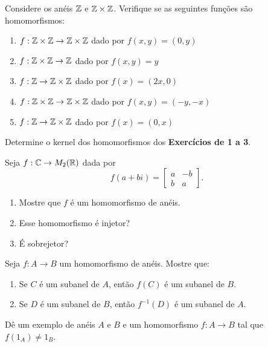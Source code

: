 \documentclass[12pt]{article}
\begin{document}
\questao  Considere os an{\'e}is $\mathbb{Z}$ e $\mathbb{Z}\times \mathbb{Z}$. Verifique se as seguintes funções s{\~a}o homomorfismos:
\begin{enumerate}[label=({\alph*})]
\item $f : \mathbb{Z}\times\mathbb{Z} \to \mathbb{Z}\times\mathbb{Z}$ dado por $f(x,y) = (0,y)$
\item $f : \mathbb{Z}\times\mathbb{Z} \to \mathbb{Z}$ dado por $f(x,y) = y$
\item $f : \mathbb{Z}\to \mathbb{Z}\times\mathbb{Z}$ dado por $f(x) = (2x,0)$
\item $f : \mathbb{Z}\times\mathbb{Z} \to \mathbb{Z}\times\mathbb{Z}$ dado por $f(x,y) = (-y,-x)$
\item $f : \mathbb{Z} \to \mathbb{Z}\times\mathbb{Z}$ dado por $f(x) = (0,x)$
\end{enumerate}

\vesp

\questao Determine o kernel dos homomorfismos dos \textbf{Exerc{\'i}cios de 1 a 3}.

\vesp

\questao Seja $f : \mathbb{C} \to M_2(\mathbb{R})$ dada por
\[
	f(a + bi) = \begin{bmatrix}
		a & -b\\
		b & a
	\end{bmatrix}.
\]
\begin{enumerate}[label=({\alph*})]
	\item Mostre que $f$ é um homomorfismo de anéis.
	\item Esse homomorfismo é injetor?
	\item É sobrejetor?
\end{enumerate}


\vesp

\questao Seja $f: A \to B$ um homomorfismo de an{\'e}is. Mostre que:
\begin{enumerate}[label=({\alph*})]
\item Se $C$  {\'e} um subanel de $A$, ent{\~a}o $f(C)$ {\'e} um subanel de $B$.
\item Se $D$ {\'e} um subanel de $B$, ent{\~a}o $f^{-1}(D)$ {\'e} um subanel de $A$.
\end{enumerate}

\vesp

\questao D{\^e} um exemplo de an{\'e}is $A$ e $B$ e um homomorfismo $f : A \to B$ tal que $f(1_A) \ne 1_B$.
\end{document}
